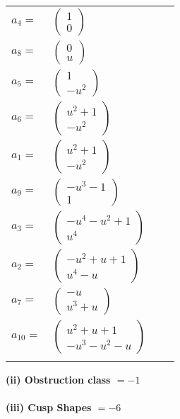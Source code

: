 \documentclass[1p]{elsarticle_modified}
\theoremstyle{definition}
\begin{document}
\begin{tabular}{m{7pt} m{180pt} m{7pt} m{180pt} }
\flushright $a_{4}=$&$\begin{pmatrix}1\\0\end{pmatrix}$ \\
\flushright $a_{8}=$&$\begin{pmatrix}0\\u\end{pmatrix}$ \\
\flushright $a_{5}=$&$\begin{pmatrix}1\\- u^2\end{pmatrix}$ \\
\flushright $a_{6}=$&$\begin{pmatrix}u^2+1\\- u^2\end{pmatrix}$ \\
\flushright $a_{1}=$&$\begin{pmatrix}u^2+1\\- u^2\end{pmatrix}$ \\
\flushright $a_{9}=$&$\begin{pmatrix}- u^3-1\\1\end{pmatrix}$ \\
\flushright $a_{3}=$&$\begin{pmatrix}- u^4- u^2+1\\u^4\end{pmatrix}$ \\
\flushright $a_{2}=$&$\begin{pmatrix}- u^2+u+1\\u^4- u\end{pmatrix}$ \\
\flushright $a_{7}=$&$\begin{pmatrix}- u\\u^3+u\end{pmatrix}$ \\
\flushright $a_{10}=$&$\begin{pmatrix}u^2+u+1\\- u^3- u^2- u\end{pmatrix}$\\&\end{tabular}
\flushleft \textbf{(ii) Obstruction class $= -1$}\\~\\
\flushleft \textbf{(iii) Cusp Shapes $= -6$}\\~\\
\end{document}
